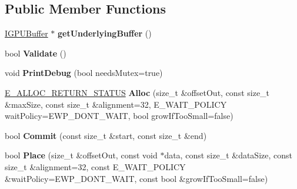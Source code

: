 \subsection*{Public Member Functions}
\begin{DoxyCompactItemize}
\item 
\hyperlink{classirr_1_1video_1_1IGPUBuffer}{I\+G\+P\+U\+Buffer} $\ast$ {\bfseries get\+Underlying\+Buffer} ()\hypertarget{classirr_1_1video_1_1IGPUTransientBuffer_ab8ad89fa1f308a360e1983f99ba58807}{}\label{classirr_1_1video_1_1IGPUTransientBuffer_ab8ad89fa1f308a360e1983f99ba58807}

\item 
bool {\bfseries Validate} ()\hypertarget{classirr_1_1video_1_1IGPUTransientBuffer_a9dcefa03ff7ea4f3ac4d3948e9170e67}{}\label{classirr_1_1video_1_1IGPUTransientBuffer_a9dcefa03ff7ea4f3ac4d3948e9170e67}

\item 
void {\bfseries Print\+Debug} (bool needs\+Mutex=true)\hypertarget{classirr_1_1video_1_1IGPUTransientBuffer_abe7c1e4eb63672bd00d46c8d5172301e}{}\label{classirr_1_1video_1_1IGPUTransientBuffer_abe7c1e4eb63672bd00d46c8d5172301e}

\item 
\hyperlink{classirr_1_1video_1_1IGPUTransientBuffer_a08e145b30588c9a3e5ec469e36f2847b}{E\+\_\+\+A\+L\+L\+O\+C\+\_\+\+R\+E\+T\+U\+R\+N\+\_\+\+S\+T\+A\+T\+US} {\bfseries Alloc} (size\+\_\+t \&offset\+Out, const size\+\_\+t \&max\+Size, const size\+\_\+t \&alignment=32, E\+\_\+\+W\+A\+I\+T\+\_\+\+P\+O\+L\+I\+CY wait\+Policy=E\+W\+P\+\_\+\+D\+O\+N\+T\+\_\+\+W\+A\+IT, bool grow\+If\+Too\+Small=false)\hypertarget{classirr_1_1video_1_1IGPUTransientBuffer_a0f7829c4499edf6ba5b26847641a4828}{}\label{classirr_1_1video_1_1IGPUTransientBuffer_a0f7829c4499edf6ba5b26847641a4828}

\item 
bool {\bfseries Commit} (const size\+\_\+t \&start, const size\+\_\+t \&end)\hypertarget{classirr_1_1video_1_1IGPUTransientBuffer_a5627d745e53c7664ac297f366f55dd9d}{}\label{classirr_1_1video_1_1IGPUTransientBuffer_a5627d745e53c7664ac297f366f55dd9d}

\item 
bool {\bfseries Place} (size\+\_\+t \&offset\+Out, const void $\ast$data, const size\+\_\+t \&data\+Size, const size\+\_\+t \&alignment=32, const E\+\_\+\+W\+A\+I\+T\+\_\+\+P\+O\+L\+I\+CY \&wait\+Policy=E\+W\+P\+\_\+\+D\+O\+N\+T\+\_\+\+W\+A\+IT, const bool \&grow\+If\+Too\+Small=false)\hypertarget{classirr_1_1video_1_1IGPUTransientBuffer_ade893f9cc1109c472568db7c69018615}{}\label{classirr_1_1video_1_1IGPUTransientBuffer_ade893f9cc1109c472568db7c69018615}


\end{DoxyCompactItemize}
